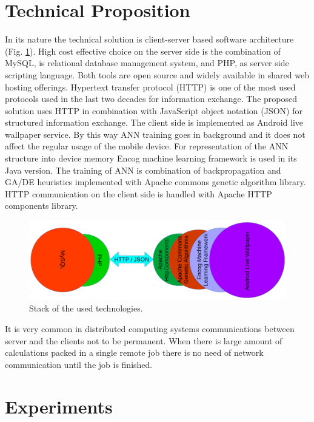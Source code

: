 \documentclass{llncs}
\begin{document}
\section{Technical Proposition} \label{Technical Proposition}

In its nature the technical solution is client-server based software architecture (Fig. \ref{fig01}). High cost effective choice on the server side is the combination of MySQL, is relational database management system, and PHP, as server side scripting language. Both tools are open source and widely available in shared web hosting offerings. Hypertext transfer protocol (HTTP) is one of the most used protocols used in the last two decades for information exchange. The proposed solution uses HTTP in combination with JavaScript object notation (JSON) for structured information exchange. The client side is implemented as Android live wallpaper service. By this way ANN training goes in background and it does not affect the regular usage of the mobile device. For representation of the ANN structure into device memory Encog machine learning framework is used in its Java version. The training of ANN is combination of backpropagation and GA/DE heuristics implemented with Apache commons genetic algorithm library. HTTP communication on the client side is handled with Apache HTTP components library. 

\begin{figure}
  \includegraphics[width=1.0\linewidth]{fig01}
  \caption{Stack of the used technologies.}
  \label{fig01}
\end{figure}
\FloatBarrier

It is very common in distributed computing systems communications between server and the clients not to be permanent. When there is large amount of calculations packed in a single remote job there is no need of network communication until the job is finished.

\section{Experiments} \label{Experiments}
\end{document}
